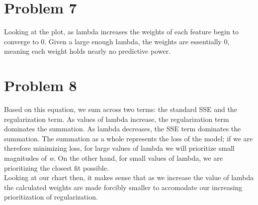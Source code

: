 \documentclass[journal]{IEEEtran}
\begin{document}
\section{Problem 7}
\noindent Looking at the plot, as lambda increases the weights of each feature
begin to converge to 0. Given a large enough lambda, the weights are essentially
0, meaning each weight holds nearly no predictive power. \newline
\medskip

\section{Problem 8}
\noindent Based on this equation, we sum across two terms: the standard SSE
and the regularization term. As values of lambda increase, the regularization
term dominates the summation. As lambda decreases, the SSE term dominates the
summation. The summation as a whole represents the loss of the model; if we
are therefore minimizing loss, for large values of lambda we will prioritize
small magnitudes of \textit{w}. On the other hand, for small values of lambda,
we are prioritizing the closest fit possible. \\

\noindent Looking at our chart then, it makes sense that as we increase the
value of lambda the calculated weights are made forcibly smaller to accomodate
our increasing prioritization of regularization. \newline
\medskip

 
\end{document}
